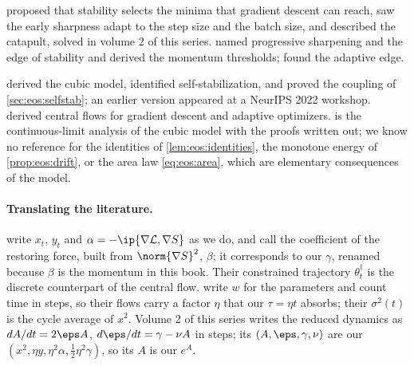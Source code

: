 \begin{refsection}
\notesandrefs
\Textcite{WuMaE2018} proposed that stability selects the minima that gradient descent can reach, \textcite{JastrzebskiEtAl2019,JastrzebskiEtAl2020} saw the early sharpness adapt to the step size and the batch size, and \textcite{LewkowyczEtAl2020} described the catapult, solved in volume 2 of this series. \Textcite{CohenEtAl2021} named progressive sharpening and the edge of stability and derived the momentum thresholds; \textcite{CohenEtAl2022} found the adaptive edge.

\Textcite{DamianNichaniLee2023} derived the cubic model, identified self-stabilization, and proved the coupling of \cref{sec:eos:selfstab}; an earlier version appeared at a NeurIPS 2022 workshop. \Textcite{CohenEtAl2025} derived central flows for gradient descent and adaptive optimizers.  is the continuous-limit analysis of the cubic model with the proofs written out; we know no reference for the identities of \cref{lem:eos:identities}, the monotone energy of \cref{prop:eos:drift}, or the area law \eqref{eq:eos:area}, which are elementary consequences of the model.

\paragraph{Translating the literature.} \Textcite{DamianNichaniLee2023} write $x_t$, $y_t$ and $\alpha=-\ip{\nabla\Loss,\nabla S}$ as we do, and call the coefficient of the restoring force, built from $\norm{\nabla S}^2$, $\beta$; it corresponds to our $\gamma$, renamed because $\beta$ is the momentum in this book. Their constrained trajectory $\theta_t^\dagger$ is the discrete counterpart of the central flow. \Textcite{CohenEtAl2025} write $w$ for the parameters and count time in steps, so their flows carry a factor $\eta$ that our $\tau=\eta t$ absorbs; their $\sigma^2(t)$ is the cycle average of $x^2$. Volume 2 of this series writes the reduced dynamics as $dA/dt=2\eps A$, $d\eps/dt=\gamma-\nu A$ in steps; its $(A,\eps,\gamma,\nu)$ are our $(x^2,\eta y,\eta^2\alpha,\frac12\eta^2\gamma)$, so its $A$ is our $e^A$.

\printchapterbib
\end{refsection}
